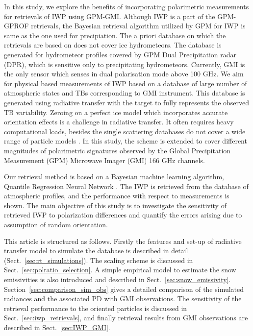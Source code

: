 \documentclass[amt, manuscript]{copernicus}
\begin{document}

In this study, we explore the benefits of incorporating polarimetric measurements for retrievals of IWP using GPM-GMI. Although IWP is a part of the GPM-GPROF retrievals, the Bayesian retrieval algorithm utilized by GPM for IWP is same as the one used for precipiation. The a priori database on which the retrievals are based on does not cover ice hydrometeors. The database is generated for hydrometeor profiles covered by GPM Dual Precipitation radar (DPR), which is sensitive only to precipitating hydrometeors. Currently, GMI is the only sensor which senses in dual polarisation mode above 100\,\,GHz. We aim for physical based measurements of IWP based on a database of large number of atmospheric states and TBs corresponding to GMI instrument. This database is generated using radiative transfer with the target to fully represents the observed TB variability. Zeroing on a perfect ice model which incorporates accurate orientation effects is a challenge in radiative transfer. It often requires heavy computational loads, besides the single scattering databases do not cover a wide range of particle models \citep{brath:micro:20}. In this study, the scheme is extended to cover different magnitudes of polarimetric signatures observed by the Global Precipitation Measurement (GPM) Microwave Imager (GMI) 166\,\,GHz channels. 

Our retrieval method is based on a Bayesian machine learning algorithm, Quantile Regression Neural Network  \citep[QRNN][]{pfreundschuh:aneur:18}. The IWP is retrieved from the database of atmospheric profiles, and the performance with respect to measurements is shown. The main objective of this study is to investigate the sensitivity of retrieved IWP to polarization differences and  quantify the errors arising due to assumption of random orientation.

This article is structured as follows. Firstly the features and  set-up of radiative transfer model to simulate the database is described in detail (Sect.~\ref{sec:rt_simulations}). The scaling scheme is discussed in Sect.~\ref{sec:polratio_selection}. A simple empirical model to estimate the snow emissivities is also introduced and described in Sect.~\ref{sec:snow_emissivity}. Section~\ref{sec:comparison_sim_obs} gives a detailed comparison of the simulated radiances and the associated PD with GMI observations. The sensitivity of the retrieval performance to the oriented particles is discussed in Sect.~\ref{sec:iwp_retrievals}, and finally retrieval results from GMI observations are described in Sect.~\ref{sec:IWP_GMI}.
 
\end{document}
